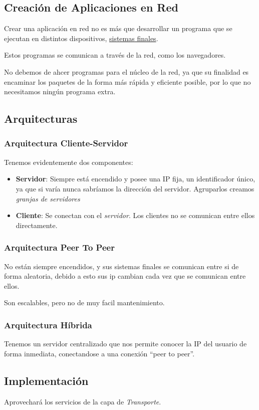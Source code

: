 \subsection{Creación de Aplicaciones en Red}
\noindent Crear una aplicación en red no es más que desarrollar un programa que se ejecutan en distintos dispositivos, \underline{sistemas finales}.
\par \noindent Estos programas se comunican a través de la red, como los navegadores.
\par \vspace{.3cm}
\noindent No debemos de ahcer programas para el núcleo de la red, ya que su finalidad es encaminar los paquetes de la forma más rápida y eficiente posible, por lo que no necesitamos ningún programa extra.
\subsection{Arquitecturas}
\subsubsection{Arquitectura Cliente-Servidor}
\noindent Tenemos evidentemente dos componentes:
\begin{itemize}
        \item \textbf{Servidor}: Siempre está encendido y posee una IP fija, un identificador único, ya que si varía nunca sabríamos la dirección del servidor. Agruparlos creamos \textit{granjas de servidores}
        \item \textbf{Cliente}: Se conectan con el \textit{servidor}. Los clientes no se comunican entre ellos directamente.
\end{itemize}
\subsubsection{Arquitectura Peer To Peer}
\noindent No están siempre encendidos, y sus sistemas finales se comunican entre si de forma aleatoria, debido a esto sus ip cambian cada vez que se comunican entre ellos.
\par \noindent Son escalables, pero no de muy facil mantenimiento.
\subsubsection{Arquitectura Híbrida}
\noindent Tenemos un servidor centralizado que nos permite conocer la IP del usuario de forma inmediata, conectandose a una conexión ``peer to peer''.
\subsection{Implementación}
\noindent Aprovechará los servicios de la capa de \textit{Transporte}.

